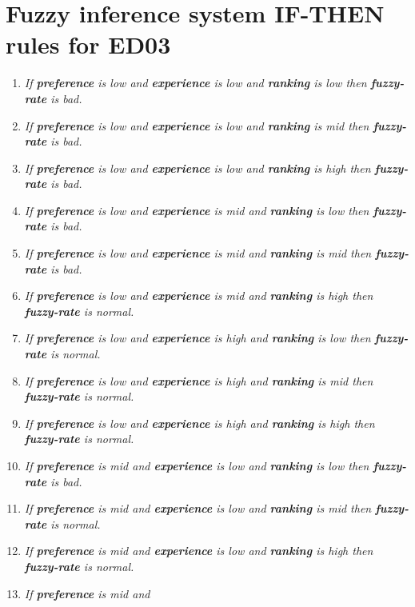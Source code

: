 
\chapter{Fuzzy inference system IF-THEN rules for ED03 }\label{apendixb}

\begin{enumerate}
	\item \textit{If \textbf{preference} is low and 
		\textbf{experience} is low and \textbf{ranking} is low then \textbf{fuzzy-rate} is bad.}
	\item \textit{If \textbf{preference} is low and 
		\textbf{experience} is low and \textbf{ranking} is mid then \textbf{fuzzy-rate} is bad.}
	\item \textit{If \textbf{preference} is low and 
		\textbf{experience} is low and \textbf{ranking} is high then \textbf{fuzzy-rate} is bad.}
	\item \textit{If \textbf{preference} is low and 
		\textbf{experience} is mid and \textbf{ranking} is low then \textbf{fuzzy-rate} is bad.}
	\item \textit{If \textbf{preference} is low and 
		\textbf{experience} is mid and \textbf{ranking} is mid then \textbf{fuzzy-rate} is bad.}
	\item \textit{If \textbf{preference} is low and 
		\textbf{experience} is mid and \textbf{ranking} is high then \textbf{fuzzy-rate} is normal.}
	\item \textit{If \textbf{preference} is low and 
		\textbf{experience} is high and \textbf{ranking} is low then \textbf{fuzzy-rate} is normal.}
	\item \textit{If \textbf{preference} is low and 
		\textbf{experience} is high and \textbf{ranking} is mid then \textbf{fuzzy-rate} is normal.}
	\item \textit{If \textbf{preference} is low and 
		\textbf{experience} is high and \textbf{ranking} is high then \textbf{fuzzy-rate} is normal.}
	\item \textit{If \textbf{preference} is mid and 
		\textbf{experience} is low and \textbf{ranking} is low then \textbf{fuzzy-rate} is bad.}
	\item \textit{If \textbf{preference} is mid and 
		\textbf{experience} is low and \textbf{ranking} is mid then \textbf{fuzzy-rate} is normal.}
	\item \textit{If \textbf{preference} is mid and 
		\textbf{experience} is low and \textbf{ranking} is high then \textbf{fuzzy-rate} is normal.}
	\item \textit{If \textbf{preference} is mid and 
}
\end{enumerate}
